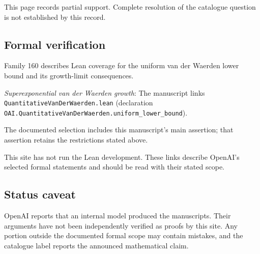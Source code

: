 \documentclass[11pt]{article}
\begin{document}
This page records partial support. Complete resolution of the catalogue question is not established by this record.

\subsection{Formal verification}
Family 160 describes Lean coverage for the uniform van der Waerden lower bound and its growth-limit consequences.

\textit{Superexponential van der Waerden growth}: The manuscript links \texttt{QuantitativeVanDerWaerden.lean} (declaration \texttt{OAI.QuantitativeVanDerWaerden.uniform\_lower\_bound}).

The documented selection includes this manuscript’s main assertion; that assertion retains the restrictions stated above.

This site has not run the Lean development. These links describe OpenAI’s selected formal statements and should be read with their stated scope.

\subsection{Status caveat}
OpenAI reports that an internal model produced the manuscripts. Their arguments have not been independently verified as proofs by this site. Any portion outside the documented formal scope may contain mistakes, and the catalogue label reports the announced mathematical claim.
\end{document}
